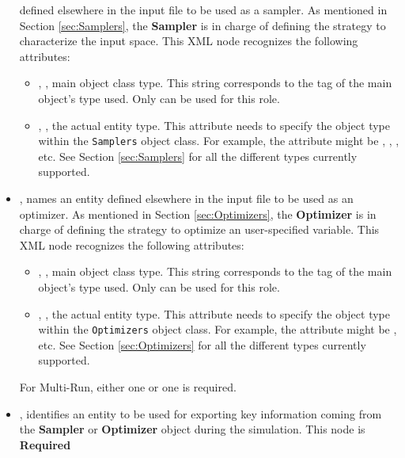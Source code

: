 \begin{itemize}
defined elsewhere in the input file to be used as a sampler.
As mentioned in Section \ref{sec:Samplers}, the \textbf{Sampler} is in charge of
defining the strategy to characterize the input space.
This XML node recognizes the following attributes:
\begin{itemize}
  \item {}, , main object class
    type.
    This string corresponds to the tag of the main object's type used.
    Only  can be used for this role.
  \item {}, , the actual entity
    type.
    This attribute needs to specify the object type within the \texttt{Samplers}
    object class.
    For example, the  attribute might be ,
   , , etc.
    See Section \ref{sec:Samplers} for all the different types currently
    supported.
\end{itemize}
\item {},  names an entity
defined elsewhere in the input file to be used as an optimizer.
As mentioned in Section \ref{sec:Optimizers}, the \textbf{Optimizer} is in charge of
defining the strategy to optimize an user-specified variable.
This XML node recognizes the following attributes:
\begin{itemize}
  \item {}, , main object class
    type.
    This string corresponds to the tag of the main object's type used.
    Only  can be used for this role.
  \item {}, , the actual entity
    type.
    This attribute needs to specify the object type within the \texttt{Optimizers}
    object class.
    For example, the  attribute might be , etc.
    See Section \ref{sec:Optimizers} for all the different types currently
    supported.
\end{itemize}
\nb For Multi-Run, either one  or one  is required.
\item {},  identifies
an entity to be used for exporting key information coming from the
\textbf{Sampler} or \textbf{Optimizer} object during the simulation. This node is \textbf{Required}

\end{itemize}
